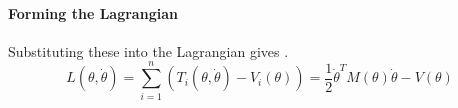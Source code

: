 \paragraph{Forming the Lagrangian}
Substituting these into the Lagrangian gives .
\begin{equation}\label{eq:LagrangianRobManip}
L(\theta, \dot{\theta})= \sum_{i=1}^{n} (T_i(\theta,\dot{\theta})- V_i(\theta)) = \frac{1}{2} \dot{\theta}^T M(\theta)\dot{\theta}-V(\theta)
\end{equation}

